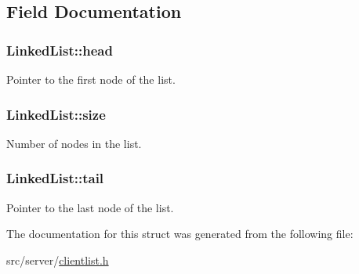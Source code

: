 \subsection{Field Documentation}
\subsubsection[{\texorpdfstring{head}{head}}]{\setlength{\rightskip}{0pt plus 5cm}Linked\+List\+::head}\hypertarget{structLinkedList_a6bcf92a302661a0ef84d2ce766b73136}{}\label{structLinkedList_a6bcf92a302661a0ef84d2ce766b73136}
Pointer to the first node of the list. 
\subsubsection[{\texorpdfstring{size}{size}}]{\setlength{\rightskip}{0pt plus 5cm}Linked\+List\+::size}\hypertarget{structLinkedList_a4c3f611f9904b8b0f10a374426e59b5d}{}\label{structLinkedList_a4c3f611f9904b8b0f10a374426e59b5d}
Number of nodes in the list. 
\subsubsection[{\texorpdfstring{tail}{tail}}]{\setlength{\rightskip}{0pt plus 5cm}Linked\+List\+::tail}\hypertarget{structLinkedList_a18d79a06868a03b79f30ebf650f7379d}{}\label{structLinkedList_a18d79a06868a03b79f30ebf650f7379d}
Pointer to the last node of the list. 

The documentation for this struct was generated from the following file\+:\begin{DoxyCompactItemize}
\item 
src/server/\hyperlink{clientlist_8h}{clientlist.\+h}\end{DoxyCompactItemize}
